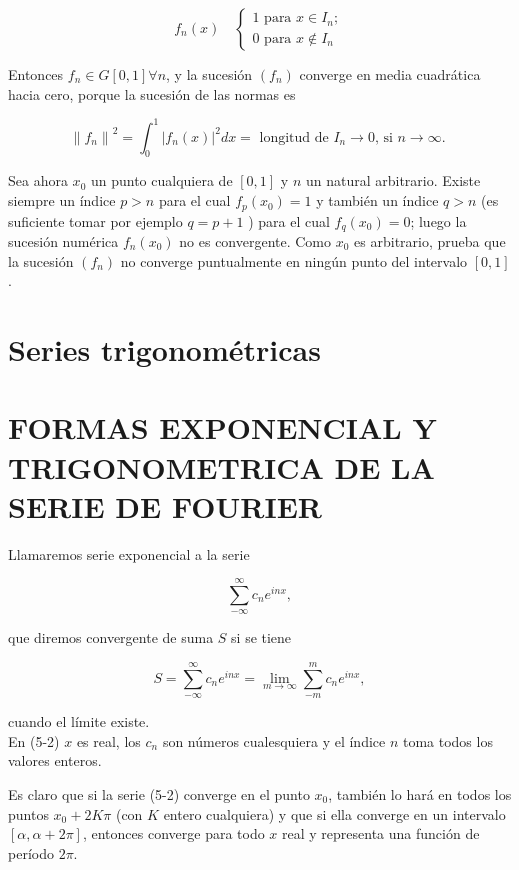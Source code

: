 \documentclass[10pt]{article}
\theoremstyle{plain}
\theoremstyle{definition}
\theoremstyle{remark}
\begin{document}
$$
f_{n}(x) \quad\left\{\begin{array}{l}
1 \text { para } x \in I_{n} ; \\
0 \text { para } x \notin I_{n}
\end{array}\right.
$$

Entonces $f_{n} \in G[0,1] \forall n$, y la sucesión $\left(f_{n}\right)$ converge en media cuadrática hacia cero, porque la sucesión de las normas es

$$
\left\|f_{n}\right\|^{2}=\int_{0}^{1}\left|f_{n}(x)\right|^{2} d x=\text { longitud de } I_{n} \rightarrow 0 \text {, si } n \rightarrow \infty \text {. }
$$

Sea ahora $x_{0}$ un punto cualquiera de $[0,1]$ y $n$ un natural arbitrario. Existe siempre un índice $p>n$ para el cual $f_{p}\left(x_{0}\right)=1$ y también un índice $q>n$ (es suficiente tomar por ejemplo $q=p+1$ ) para el cual $f_{q}\left(x_{0}\right)=0$; luego la sucesión numérica $f_{n}\left(x_{0}\right)$ no es convergente. Como $x_{0}$ es arbitrario, prueba que la sucesión $\left(f_{n}\right)$ no converge puntualmente en ningún punto del intervalo $[0,1]$.

\section{Series trigonométricas}
\section*{FORMAS EXPONENCIAL Y TRIGONOMETRICA DE LA SERIE DE FOURIER}
Llamaremos serie exponencial a la serie


\begin{equation*}
\sum_{-\infty}^{\infty} c_{n} e^{i n x}, \tag{5-1}
\end{equation*}


que diremos convergente de suma $S$ si se tiene


\begin{equation*}
S=\sum_{-\infty}^{\infty} c_{n} e^{i n x}=\lim _{m \rightarrow \infty} \sum_{-m}^{m} c_{n} e^{i n x}, \tag{5-2}
\end{equation*}


cuando el límite existe.\\
En (5-2) $x$ es real, los $c_{n}$ son números cualesquiera y el índice $n$ toma todos los valores enteros.

Es claro que si la serie (5-2) converge en el punto $x_{0}$, también lo hará en todos los puntos $x_{0}+2 K \pi$ (con $K$ entero cualquiera) y que si ella converge en un intervalo $[\alpha, \alpha+2 \pi]$, entonces converge para todo $x$ real y representa una función de período $2 \pi$.
\end{document}
